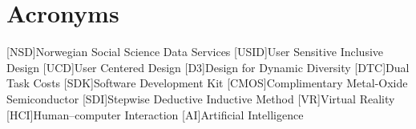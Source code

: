 \chapter*{Acronyms}
\begin{acronym}
[NSD]{Norwegian Social Science Data Services}
[USID]{User Sensitive Inclusive Design}
[UCD]{User Centered Design}
[D3]{Design for Dynamic Diversity}
[DTC]{Dual Task Costs}
[SDK]{Software Development Kit}
[CMOS]{Complimentary Metal-Oxide Semiconductor}
[SDI]{Stepwise Deductive Inductive Method}
[VR]{Virtual Reality}
[HCI]{Human–computer Interaction}
[AI]{Artificial Intelligence}
\end{acronym}